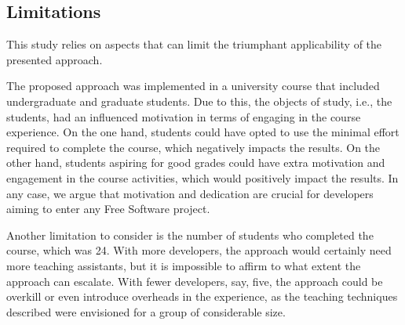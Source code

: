 \subsection{Limitations}

This study relies on aspects that can limit the triumphant applicability of the
presented approach.

The proposed approach was implemented in a university course that included
undergraduate and graduate students. Due to this, the objects of study, i.e.,
the students, had an influenced motivation in terms of engaging in the course
experience. On the one hand, students could have opted to use the minimal effort
required to complete the course, which negatively impacts the results. On the
other hand, students aspiring for good grades could have extra motivation and
engagement in the course activities, which would positively impact the results.
In any case, we argue that motivation and dedication are crucial for developers
aiming to enter any Free Software project.

Another limitation to consider is the number of students who completed the
course, which was 24. With more developers, the approach would certainly need
more teaching assistants, but it is impossible to affirm to what extent the
approach can escalate. With fewer developers, say, five, the approach could be
overkill or even introduce overheads in the experience, as the teaching
techniques described were envisioned for a group of considerable size.

